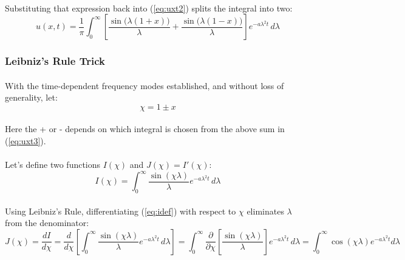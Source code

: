 \paragraph{}
Substituting that expression back into (\ref{eq:uxt2}) splits the integral into two:
\begin{equation}
\label{eq:uxt3}
u(x,t) = \frac{1}{\pi} \int_{0}^{\infty} \left[ \frac{\sin\big(\lambda(1+x)\big)}{\lambda} + \frac{\sin\big(\lambda(1-x)\big)}{\lambda} \right] e^{-a\lambda^2 t} \, d\lambda
\end{equation}

\subsubsection*{Leibniz's Rule Trick}
\paragraph{}
With the time-dependent frequency modes established, and without loss of generality, let:
\begin{equation}
\label{eq:chidef}
\chi = 1 \pm x
\end{equation}
\paragraph{}
Here the + or - depends on which integral is chosen from the above sum in (\ref{eq:uxt3}). 
\paragraph{}
Let's define two functions $I(\chi)$ and $J(\chi)=I'(\chi)$:
\begin{equation}
\label{eq:idef}
I(\chi) = \int_{0}^{\infty} \frac{\sin(\chi \lambda)}{\lambda} e^{-a \lambda^2 t} \, d\lambda
\end{equation}
\paragraph{}
Using Leibniz's Rule, differentiating (\ref{eq:idef}) with respect to $\chi$ eliminates $\lambda$ from the denominator:
\begin{equation*}
J(\chi)=\frac{dI}{d\chi} = \frac{d}{d\chi} \left[ \int_{0}^{\infty} \frac{\sin(\chi\lambda)}{\lambda} e^{-a \lambda^2 t} \, d\lambda \right] = \int_{0}^{\infty} \frac{\partial}{\partial \chi} \left[ \frac{\sin(\chi\lambda)}{\lambda} \right] e^{-a \lambda^2 t} \, d\lambda = \int_{0}^{\infty} \cos(\chi\lambda) e^{-a \lambda^2 t} d\lambda
\end{equation*}
